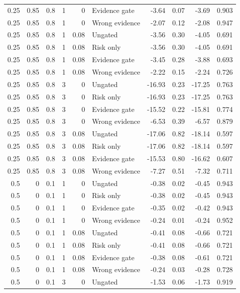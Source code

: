 \begin{longtable}{rrrrrlrrrr}
0.25 & 0.85 & 0.8 & 1 & 0 & Evidence gate & -3.64 & 0.07 & -3.69 & 0.903\\
0.25 & 0.85 & 0.8 & 1 & 0 & Wrong evidence & -2.07 & 0.12 & -2.08 & 0.947\\
0.25 & 0.85 & 0.8 & 1 & 0.08 & Ungated & -3.56 & 0.30 & -4.05 & 0.691\\
0.25 & 0.85 & 0.8 & 1 & 0.08 & Risk only & -3.56 & 0.30 & -4.05 & 0.691\\
0.25 & 0.85 & 0.8 & 1 & 0.08 & Evidence gate & -3.45 & 0.28 & -3.88 & 0.693\\
0.25 & 0.85 & 0.8 & 1 & 0.08 & Wrong evidence & -2.22 & 0.15 & -2.24 & 0.726\\
0.25 & 0.85 & 0.8 & 3 & 0 & Ungated & -16.93 & 0.23 & -17.25 & 0.763\\
0.25 & 0.85 & 0.8 & 3 & 0 & Risk only & -16.93 & 0.23 & -17.25 & 0.763\\
0.25 & 0.85 & 0.8 & 3 & 0 & Evidence gate & -15.52 & 0.22 & -15.81 & 0.774\\
0.25 & 0.85 & 0.8 & 3 & 0 & Wrong evidence & -6.53 & 0.39 & -6.57 & 0.879\\
0.25 & 0.85 & 0.8 & 3 & 0.08 & Ungated & -17.06 & 0.82 & -18.14 & 0.597\\
0.25 & 0.85 & 0.8 & 3 & 0.08 & Risk only & -17.06 & 0.82 & -18.14 & 0.597\\
0.25 & 0.85 & 0.8 & 3 & 0.08 & Evidence gate & -15.53 & 0.80 & -16.62 & 0.607\\
0.25 & 0.85 & 0.8 & 3 & 0.08 & Wrong evidence & -7.27 & 0.51 & -7.32 & 0.711\\
0.5 & 0 & 0.1 & 1 & 0 & Ungated & -0.38 & 0.02 & -0.45 & 0.943\\
0.5 & 0 & 0.1 & 1 & 0 & Risk only & -0.38 & 0.02 & -0.45 & 0.943\\
0.5 & 0 & 0.1 & 1 & 0 & Evidence gate & -0.35 & 0.02 & -0.42 & 0.943\\
0.5 & 0 & 0.1 & 1 & 0 & Wrong evidence & -0.24 & 0.01 & -0.24 & 0.952\\
0.5 & 0 & 0.1 & 1 & 0.08 & Ungated & -0.41 & 0.08 & -0.66 & 0.721\\
0.5 & 0 & 0.1 & 1 & 0.08 & Risk only & -0.41 & 0.08 & -0.66 & 0.721\\
0.5 & 0 & 0.1 & 1 & 0.08 & Evidence gate & -0.38 & 0.08 & -0.61 & 0.721\\
0.5 & 0 & 0.1 & 1 & 0.08 & Wrong evidence & -0.24 & 0.03 & -0.28 & 0.728\\
0.5 & 0 & 0.1 & 3 & 0 & Ungated & -1.53 & 0.06 & -1.73 & 0.919\\

\end{longtable}

